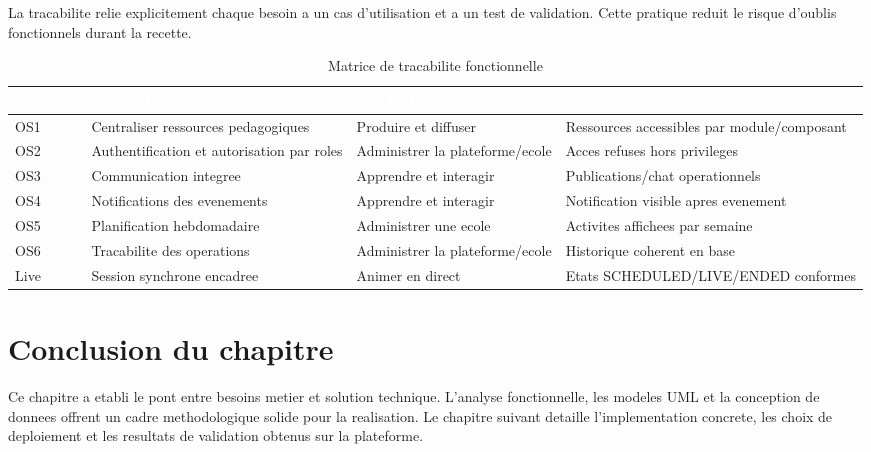 ﻿\documentclass[12pt,a4paper,oneside]{report}
\begin{document}
La tracabilite relie explicitement chaque besoin a un cas d'utilisation et a un test de validation. Cette pratique reduit le risque d'oublis fonctionnels durant la recette.

\renewcommand{\arraystretch}{1.35}
\begin{longtable}{|p{2.2cm}|p{4.1cm}|p{3.5cm}|p{3.6cm}|}
\caption{Matrice de tracabilite fonctionnelle}\label{tab:traceabilite}\\
\hline
\rowcolor{ustoblue}
\textcolor{white}{\textbf{Exigence}} &
\textcolor{white}{\textbf{Description}} &
\textcolor{white}{\textbf{Cas UML associe}} &
\textcolor{white}{\textbf{Validation attendue}} \\
\hline
OS1 & Centraliser ressources pedagogiques & Produire et diffuser & Ressources accessibles par module/composant \\
\hline
OS2 & Authentification et autorisation par roles & Administrer la plateforme/ecole & Acces refuses hors privileges \\
\hline
OS3 & Communication integree & Apprendre et interagir & Publications/chat operationnels \\
\hline
OS4 & Notifications des evenements & Apprendre et interagir & Notification visible apres evenement \\
\hline
OS5 & Planification hebdomadaire & Administrer une ecole & Activites affichees par semaine \\
\hline
OS6 & Tracabilite des operations & Administrer la plateforme/ecole & Historique coherent en base \\
\hline
Live & Session synchrone encadree & Animer en direct & Etats SCHEDULED/LIVE/ENDED conformes \\
\hline
\end{longtable}

\section{Conclusion du chapitre}

Ce chapitre a etabli le pont entre besoins metier et solution technique. L'analyse fonctionnelle, les modeles UML et la conception de donnees offrent un cadre methodologique solide pour la realisation. Le chapitre suivant detaille l'implementation concrete, les choix de deploiement et les resultats de validation obtenus sur la plateforme.
\end{document}
